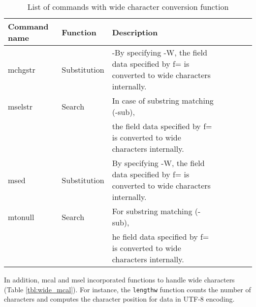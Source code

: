 \begin{table}[htbp]
\begin{center}
\caption{List of commands with wide character conversion function \label{tbl:wide_cmd}}
\begin{tabular}{lp{2cm}lp{2cm}lp{4cm}l}
\hline
Command name & Function & Description \\
\hline
mchgstr & Substitution & -By specifying -W, the field data specified by f=  is converted to wide characters internally. \\
mselstr & Search & In case of substring matching (-sub),\\
        &      & the field data specified by f=  is converted to wide characters internally. \\
msed    & Substitution & By specifying -W, the field data specified by f=  is converted to wide characters internally.\\
mtonull & Search & For substring matching (-sub),\\
        &      & he field data specified by f=  is converted to wide characters internally. \\
\hline
\end{tabular}
\end{center}
\end{table}

In addition, mcal and msel incorporated functions to handle wide characters (Table \ref{tbl:wide_mcal}).
For instance, the \verb|lengthw| function counts the number of characters and computes the character position for data in UTF-8 encoding. 

